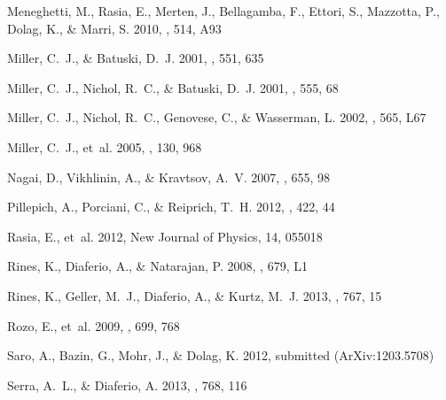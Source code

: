 \documentclass[iop]{emulateapj}
\begin{document}
\begin{thebibliography}{42}
{Meneghetti}, M., {Rasia}, E., {Merten}, J., {Bellagamba}, F., {Ettori}, S.,
  {Mazzotta}, P., {Dolag}, K., \& {Marri}, S. 2010, \aap, 514, A93

{Miller}, C.~J., \& {Batuski}, D.~J. 2001, \apj, 551, 635

{Miller}, C.~J., {Nichol}, R.~C., \& {Batuski}, D.~J. 2001, \apj, 555, 68

{Miller}, C.~J., {Nichol}, R.~C., {Genovese}, C., \& {Wasserman}, L. 2002,
  \apjl, 565, L67

{Miller}, C.~J., {et~al.} 2005, \aj, 130, 968

{Nagai}, D., {Vikhlinin}, A., \& {Kravtsov}, A.~V. 2007, \apj, 655, 98

{Pillepich}, A., {Porciani}, C., \& {Reiprich}, T.~H. 2012, \mnras, 422, 44

{Rasia}, E., {et~al.} 2012, New Journal of Physics, 14, 055018

{Rines}, K., {Diaferio}, A., \& {Natarajan}, P. 2008, \apjl, 679, L1

{Rines}, K., {Geller}, M.~J., {Diaferio}, A., \& {Kurtz}, M.~J. 2013, \apj,
  767, 15

{Rozo}, E., {et~al.} 2009, \apj, 699, 768

{Saro}, A., {Bazin}, G., {Mohr}, J., \& {Dolag}, K. 2012, submitted (ArXiv:1203.5708)

{Serra}, A.~L., \& {Diaferio}, A. 2013, \apj, 768, 116


\end{thebibliography}
\end{document}
